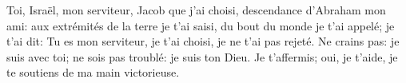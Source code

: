 Toi, Israël, mon serviteur, Jacob que j’ai choisi, descendance d’Abraham mon ami:
	aux extrémités de la terre je t’ai saisi, du bout du monde je t’ai appelé;
	je t’ai dit: Tu es mon serviteur, je t’ai choisi, je ne t’ai pas rejeté.
Ne crains pas: je suis avec toi; ne sois pas troublé: je suis ton Dieu.
	Je t’affermis; oui, je t’aide, je te soutiens de ma main victorieuse.
